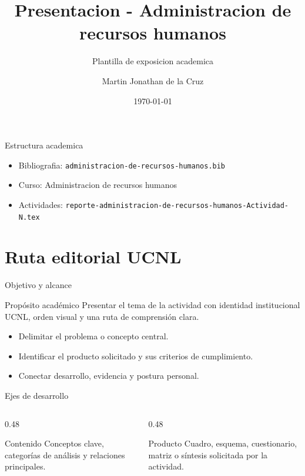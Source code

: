 ﻿\documentclass[spanish,aspectratio=169]{beamer}
\title{Presentacion - Administracion de recursos humanos}
\subtitle{Plantilla de exposicion academica}
\author{Martin Jonathan de la Cruz}
\institute{Universidad Ciudadana de Nuevo Leon}
\date{\today}
\begin{document}
\begin{frame}
  \titlepage
\end{frame}

\begin{frame}{Estructura academica}
  \begin{itemize}
    \item Bibliografia: \texttt{administracion-de-recursos-humanos.bib}
    \item Curso: Administracion de recursos humanos
    \item Actividades: \texttt{reporte-administracion-de-recursos-humanos-Actividad-N.tex}
  \end{itemize}
\end{frame}


\section{Ruta editorial UCNL}

\begin{frame}{Objetivo y alcance}
  \begin{block}{Propósito académico}
    Presentar el tema de la actividad con identidad institucional UCNL, orden visual y una ruta de comprensión clara.
  \end{block}
  \begin{itemize}
    \item Delimitar el problema o concepto central.
    \item Identificar el producto solicitado y sus criterios de cumplimiento.
    \item Conectar desarrollo, evidencia y postura personal.
  \end{itemize}
\end{frame}

\begin{frame}{Ejes de desarrollo}
  \begin{columns}[T,totalwidth=\textwidth]
    \begin{column}{0.48\textwidth}
      \begin{block}{Contenido}
        Conceptos clave, categorías de análisis y relaciones principales.
      \end{block}
    \end{column}
    \begin{column}{0.48\textwidth}
      \begin{block}{Producto}
        Cuadro, esquema, cuestionario, matriz o síntesis solicitada por la actividad.
      \end{block}
    \end{column}
  \end{columns}
\end{frame}
\end{document}
